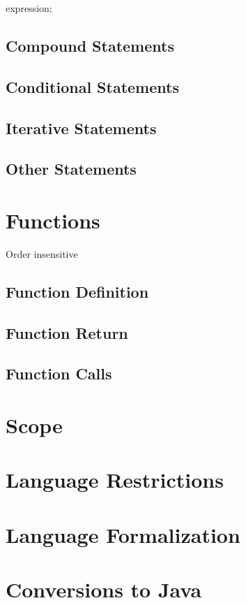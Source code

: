 \documentclass[12pt,psfig,a4]{article}
\begin{document}
\begin{code}
expression;
\end{code}

\subsection{Compound Statements}

\subsection{Conditional Statements}

\subsection{Iterative Statements}

\subsection{Other Statements}

\section{Functions}
Order insensitive

\subsection{Function Definition}

\subsection{Function Return}

\subsection{Function Calls}

\section{Scope}

\section{Language Restrictions}

\section{Language Formalization}

\section{Conversions to Java}






\end{document}
